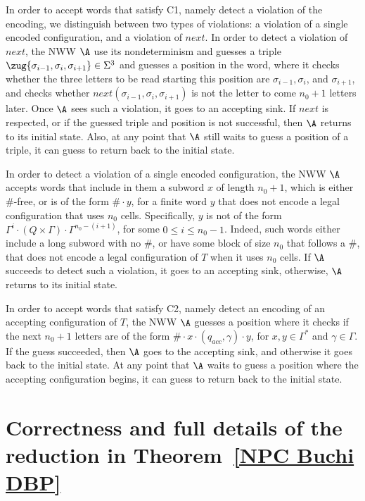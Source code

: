 \documentclass{lmcs}
\begin{document}
In order to accept words that satisfy C1, namely detect a violation of the encoding, we distinguish between two types of violations: a violation of a single encoded configuration, and a violation of $next$. 
In order to detect a violation of $next$, the NWW $\A$ use its
nondeterminism and guesses a triple $\zug{\sigma_{i-1},\sigma_i,\sigma_{i+1}} \in \Sigma^3$ and guesses a position in the word, where it checks whether the three letters
to be read starting this position are $\sigma_{i-1},\sigma_i$, and
$\sigma_{i+1}$, and checks whether
$next(\sigma_{i-1},\sigma_i,\sigma_{i+1})$ is not the
letter to come $n_0+1$ letters later.
Once $\A$ sees such a violation, it goes to an accepting sink. If $next$ is respected, 
or if the guessed triple and position is not successful, then $\A$ returns to its initial state. Also, at any point that $\A$ still waits to guess a position of a triple, it can guess to return back to the initial state.

In order to detect a violation of a single encoded configuration, the NWW $\A$ accepts words that include in them a subword $x$ of length $n_0+1$, which is either $\#$-free, or is of the form $\#\cdot y$, for a finite word $y$ that does not encode a legal configuration that uses $n_0$ cells. Specifically, $y$ is not of the form $\Gamma^i \cdot (Q\times \Gamma) \cdot \Gamma^{n_0-(i+1)}$, for some $0 \leq i \leq n_0-1$.
Indeed, such words either include a long subword with no $\#$, 
or have some block of size $n_0$ that follows a $\#$, that does not encode a legal configuration of $T$ when it uses $n_0$ cells. 
If $\A$ succeeds to detect such a violation, it goes to an accepting sink, otherwise, $\A$ returns to its initial state.	
	
	

In order to accept words that satisfy C2, namely detect an encoding of an accepting configuration of $T$, the NWW $\A$ guesses a position where it checks if the next $n_0+1$ letters are of the form $\# \cdot x\cdot (q_{acc},\gamma)\cdot y$, for $x,y\in \Gamma^*$ and $\gamma\in \Gamma$. 
If the guess succeeded, then $\A$ goes to the accepting sink, and otherwise it goes back to the initial state. At any point that $\A$ waits to guess a position where the accepting configuration begins, it can guess to return back to the initial state.

\section{Correctness and full details of the reduction in Theorem~\ref{NPC Buchi DBP}}
\label{app np HDnbw}
\end{document}
